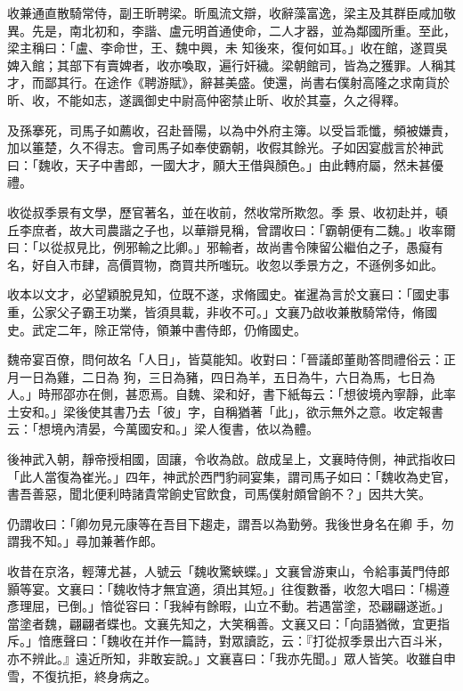 \begin{pinyinscope}
 收兼通直散騎常侍，副王昕聘梁。昕風流文辯，收辭藻富逸，梁主及其群臣咸加敬異。先是，南北初和，李諧、盧元明首通使命，二人才器，並為鄰國所重。至此，梁主稱曰：「盧、李命世，王、魏中興，未
 知後來，復何如耳。」收在館，遂買吳婢入館；其部下有賣婢者，收亦喚取，遍行奸穢。梁朝館司，皆為之獲罪。人稱其才，而鄙其行。在途作《聘游賦》，辭甚美盛。使還，尚書右僕射高隆之求南貨於昕、收，不能如志，遂諷御史中尉高仲密禁止昕、收於其臺，久之得釋。



 及孫搴死，司馬子如薦收，召赴晉陽，以為中外府主簿。以受旨乖懺，頻被嫌責，加以箠楚，久不得志。會司馬子如奉使霸朝，收假其餘光。子如因宴戲言於神武曰：「魏收，天子中書郎，一國大才，願大王借與顏色。」由此轉府屬，然未甚優禮。



 收從叔季景有文學，歷官著名，並在收前，然收常所欺忽。季
 景、收初赴并，頓丘李庶者，故大司農諧之子也，以華辯見稱，曾謂收曰：「霸朝便有二魏。」收率爾曰：「以從叔見比，例邪輸之比卿。」邪輸者，故尚書令陳留公繼伯之子，愚癡有名，好自入市肆，高價買物，商買共所嗤玩。收忽以季景方之，不遜例多如此。



 收本以文才，必望穎脫見知，位既不遂，求脩國史。崔暹為言於文襄曰：「國史事重，公家父子霸王功業，皆須具載，非收不可。」文襄乃啟收兼散騎常侍，脩國史。武定二年，除正常侍，領兼中書侍郎，仍脩國史。



 魏帝宴百僚，問何故名「人日」，皆莫能知。收對曰：「晉議郎董勛答問禮俗云：正月一日為雞，二日為
 狗，三日為豬，四日為羊，五日為牛，六日為馬，七日為人。」時邢邵亦在側，甚恧焉。自魏、梁和好，書下紙每云：「想彼境內寧靜，此率土安和。」梁後使其書乃去「彼」字，自稱猶著「此」，欲示無外之意。收定報書云：「想境內清晏，今萬國安和。」梁人復書，依以為體。



 後神武入朝，靜帝授相國，固讓，令收為啟。啟成呈上，文襄時侍側，神武指收曰「此人當復為崔光。」四年，神武於西門豹祠宴集，謂司馬子如曰：「魏收為史官，書吾善惡，聞北便利時諸貴常餉史官飲食，司馬僕射頗曾餉不？」因共大笑。



 仍謂收曰：「卿勿見元康等在吾目下趨走，謂吾以為勤勞。我後世身名在卿
 手，勿謂我不知。」尋加兼著作郎。



 收昔在京洛，輕薄尤甚，人號云「魏收驚蛺蝶。」文襄曾游東山，令給事黃門侍郎顥等宴。文襄曰：「魏收恃才無宜適，須出其短。」往復數番，收忽大唱曰：「楊遵彥理屈，已倒。」愔從容曰：「我綽有餘暇，山立不動。若遇當塗，恐翩翩遂逝。」當塗者魏，翩翩者蝶也。文襄先知之，大笑稱善。文襄又曰：「向語猶微，宜更指斥。」愔應聲曰：「魏收在并作一篇詩，對眾讀訖，云：『打從叔季景出六百斗米，亦不辨此。』遠近所知，非敢妄說。」文襄喜曰：「我亦先聞。」眾人皆笑。收雖自申雪，不復抗拒，終身病之。




\end{pinyinscope}
